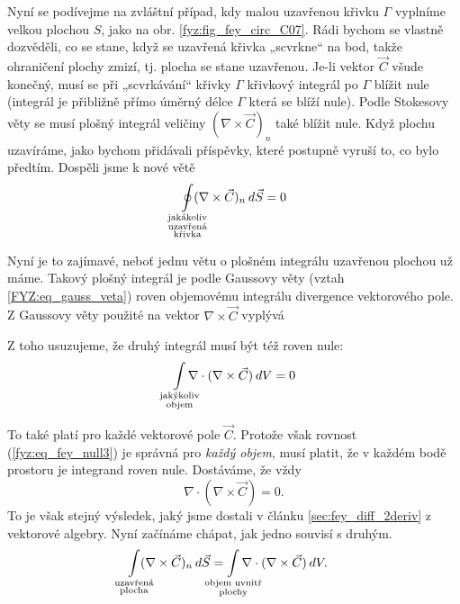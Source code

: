     Nyní se podívejme na zvláštní případ, kdy malou uzavřenou křivku \(\Gamma\) vyplníme velkou 
    plochou \(S\), jako na obr. \ref{fyz:fig_fey_circ_C07}. Rádi bychom se vlastně dozvěděli, co se 
    stane, když se uzavřená křivka „scvrkne“ na bod, takže ohraničení plochy zmizí, tj. plocha se 
    stane uzavřenou. Je-li vektor \(\vec{C}\) všude konečný, musí se při „scvrkávání“ křivky 
    \(\Gamma\) křivkový integrál po \(\Gamma\) blížit nule (integrál je přibližně přímo úměrný délce 
    \(\Gamma\) která se blíží nule). Podle Stokesovy věty se musí plošný integrál veličiny 
    \((\nabla\times\vec{C})_n\) také blížit nule. Když plochu uzavíráme, jako bychom přidávali 
    příspěvky, které postupně vyruší to, co bylo předtím. Dospěli jsme k nové větě
    \begin{equation}\label{fyz:eq_fey_null1} 
      \limitoint_{\mathclap{\substack{\text{jakákoliv}\\\text{uzavřená}\\\text{křivka}}}}
       (\nabla\times\vec{C})_n \dd{\vec{S}} = 0
    \end{equation}
    
    Nyní je to zajímavé, neboť jednu větu o plošném integrálu uzavřenou plochou už máme. Takový 
    plošný integrál je podle Gaussovy věty (vztah \ref{FYZ:eq_gauss_veta}) roven objemovému 
    integrálu divergence vektorového pole. Z Gaussovy věty použité na vektor 
    \(\nabla\times\vec{C}\) vyplývá            
    
    Z toho usuzujeme, že druhý integrál musí být též roven nule:
    \begin{equation}\label{fyz:eq_fey_null3} 
     \limitint_{\mathclap{\substack{\text{jakýkoliv}\\\text{objem}}}}
      \nabla\cdot(\nabla\times\vec{C})\dd{V} = 0
    \end{equation}
            
    To také platí pro každé vektorové pole \(\vec{C}\). Protože však rovnost 
    (\ref{fyz:eq_fey_null3}) je správná pro \emph{každý objem}, musí platit, že v každém bodě 
    prostoru je integrand roven nule. Dostáváme, že vždy
    \begin{equation}\label{fyz:eq_fey_null4}
     \nabla\cdot(\nabla\times\vec{C})=0.
    \end{equation}
    To je však stejný výsledek, jaký jsme dostali v článku \ref{sec:fey_diff_2deriv} z vektorové 
    algebry. Nyní začínáme chápat, jak jedno souvisí s druhým.      
    \begin{align}\label{fyz:eq_fey_null2} 
      \limitint_{\mathclap{\substack{\text{uzavřená}\\\text{plocha}}}}
       (\nabla\times\vec{C})_n \dd{\vec{S}}
      &=
      \limitint_{\mathclap{\substack{\text{objem uvnitř}\\\text{plochy}}}}
        \nabla\cdot(\nabla\times\vec{C})\dd{V}.
    \end{align}        
    
